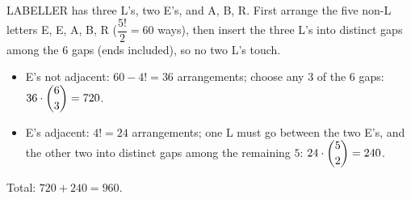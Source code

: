 LABELLER has three L's, two E's, and A, B, R. First arrange the five non-L letters E, E, A, B, R ($\dfrac{5!}{2}=60$ ways), then insert the three L's into distinct gaps among the $6$ gaps (ends included), so no two L's touch.
\begin{itemize}
\item E's not adjacent: $60-4!=36$ arrangements; choose any $3$ of the $6$ gaps: $36\cdot\dbinom63=720$.
\item E's adjacent: $4!=24$ arrangements; one L must go between the two E's, and the other two into distinct gaps among the remaining $5$: $24\cdot\dbinom52=240$.
\end{itemize}
Total: $720+240=\boxed{960}$.
